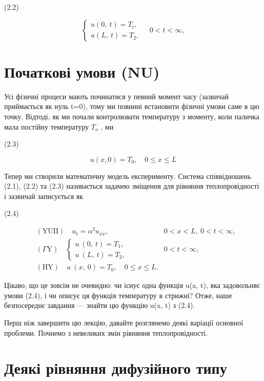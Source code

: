 \documentclass[
  ukrainian,
]{article}
\begin{document}
(2.2)

\[\left\{ \begin{array}{l} u\left(0,\ t\right) = T_{t}, \\ u\left(L,\ t\right) = T_{2}, \end{array} \right. \quad 0 < t < \infty,\]

\section{Початкові умови
(NU)}\label{ux43fux43eux447ux430ux442ux43aux43eux432ux456-ux443ux43cux43eux432ux438-nu}

Усі фізичні процеси мають починатися у певний момент часу (зазвичай
приймається як нуль t=0), тому ми повинні встановити фізичні умови саме
в цю точку. Відтоді, як ми почали контролювати температуру з моменту,
коли паличка мала постійну температуру \(T_{\mathrm{ }o}\) , ми

(2.3)

\[u(x, 0) = T_0, \quad 0 \le x \le L\]

Тепер ми створили математичну модель експерименту. Система співвідношень
(2.1), (2.2) та (2.3) називається задачею зміщення для рівняння
теплопровідності і зазвичай записується як

(2.4)

\[\begin{aligned} & (\text{YUII}) \quad u_t = \alpha^2 u_{xx}, & 0 < x < L, \ 0 < t < \infty, \\ & \left( \Gamma \text{Y} \right) \quad \begin{cases} u \ (0, \ t) = T_1, \\ u \ (L, \ t) = T_2, \end{cases} & 0 < t < \infty, \\ & (\text{HY}) \quad u \ (x, \ 0) = T_0, \quad 0 \leqslant x \leqslant L. \end{aligned}\]

Цікаво, що це зовсім не очевидно: чи існує одна функція u(x, t), яка
задовольняє умови (2.4), і чи описує ця функція температуру в стрижні?
Отже, наше безпосереднє завдання --- знайти цю функцію u(x, t) з (2.4).

Перш ніж завершити цю лекцію, давайте розглянемо деякі варіації основної
проблеми. Почнемо з невеликих змін рівняння теплопровідності.

\section{Деякі рівняння дифузійного
типу}\label{ux434ux435ux44fux43aux456-ux440ux456ux432ux43dux44fux43dux43dux44f-ux434ux438ux444ux443ux437ux456ux439ux43dux43eux433ux43e-ux442ux438ux43fux443}
\end{document}
